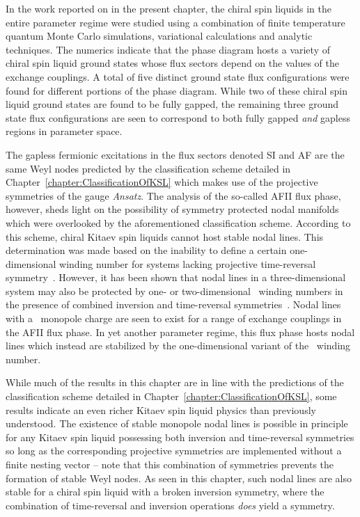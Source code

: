 In the work reported on in the present chapter, the chiral spin liquids in the entire parameter regime were studied using a combination of finite temperature quantum Monte Carlo simulations, variational calculations and analytic techniques.
The numerics indicate that the phase diagram hosts a variety of chiral spin liquid ground states whose flux sectors depend on the values of the exchange couplings.
A total of five distinct ground state flux configurations were found for different portions of the phase diagram.
While two of these chiral spin liquid ground states are found to be fully gapped, the remaining three ground state flux configurations are seen to correspond to both fully gapped \textit{and} gapless regions in parameter space.

The gapless fermionic excitations in the flux sectors denoted SI and AF are the same Weyl nodes predicted by the classification scheme detailed in Chapter~\ref{chapter:ClassificationOfKSL} which makes use of the projective symmetries of the gauge \textit{Ansatz}.
The analysis of the so-called AFII flux phase, however, sheds light on the possibility of symmetry protected nodal manifolds which were overlooked by the aforementioned classification scheme.
According to this scheme, chiral Kitaev spin liquids cannot host stable nodal lines.
This determination was made based on the inability to define a certain one-dimensional winding number for systems lacking projective time-reversal symmetry~\cite{ZhaoPRL2013,MatsuuraNJP2013}.
However, it has been shown that nodal lines in a three-dimensional system may also be protected by one- or two-dimensional \ZZ~winding numbers in the presence of combined inversion and time-reversal symmetries~\cite{KimPRL2015,FangPRB2015}.
Nodal lines with a \ZZ~monopole charge are seen to exist for a range of exchange couplings in the AFII flux phase.
In yet another parameter regime, this flux phase hosts nodal lines which instead are stabilized by the one-dimensional variant of the \ZZ~winding number.

While much of the results in this chapter are in line with the predictions of the classification scheme detailed in Chapter~\ref{chapter:ClassificationOfKSL}, some results indicate an even richer Kitaev spin liquid physics than previously understood.
The existence of stable monopole nodal lines is possible in principle for any Kitaev spin liquid possessing both inversion and time-reversal symmetries so long as the corresponding projective symmetries are implemented without a finite nesting vector  -- note that this combination of symmetries prevents the formation of stable Weyl nodes.
As seen in this chapter, such nodal lines are also stable for a chiral spin liquid with a broken inversion symmetry, where the combination of time-reversal and inversion operations \textit{does} yield a symmetry.